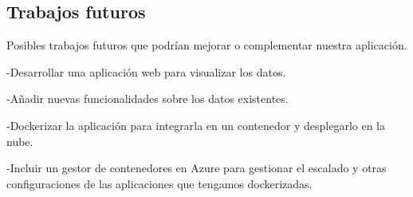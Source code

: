 \documentclass[12pt]{report} %
\begin{document}
	\subsection{Trabajos futuros}
	
	Posibles trabajos futuros que podrían mejorar o complementar nuestra aplicación.
	
	-Desarrollar una aplicación web para visualizar los datos.
	
	-Añadir nuevas funcionalidades sobre los datos existentes.
	
	-Dockerizar  la aplicación para integrarla en un contenedor y desplegarlo en la nube.
	
	-Incluir un gestor de contenedores en Azure para gestionar el escalado y otras configuraciones de las aplicaciones que tengamos dockerizadas.
	

	









\clearpage
{}
\printbibliography




\end{document}
